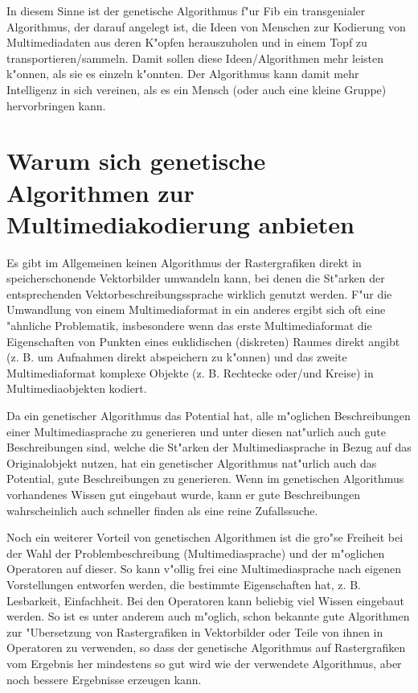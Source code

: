 In diesem Sinne ist der genetische Algorithmus f"ur Fib ein transgenialer Algorithmus, der darauf angelegt ist, die Ideen von Menschen zur Kodierung von Multimediadaten aus deren K"opfen herauszuholen und in einem Topf zu transportieren/sammeln. Damit sollen diese Ideen/Algorithmen mehr leisten k"onnen, als sie es einzeln k"onnten. Der Algorithmus kann damit mehr Intelligenz in sich vereinen, als es ein Mensch (oder auch eine kleine Gruppe) hervorbringen kann.


\section{Warum sich genetische Algorithmen zur Multimediakodierung anbieten}

Es gibt im Allgemeinen keinen Algorithmus der Rastergrafiken direkt in speicherschonende Vektorbilder umwandeln kann, bei denen die St"arken der entsprechenden Vektorbeschreibungssprache wirklich genutzt werden. F"ur die Umwandlung von einem Multimediaformat in ein anderes ergibt sich oft eine "ahnliche Problematik, insbesondere wenn das erste Multimediaformat die Eigenschaften von Punkten eines euklidischen (diskreten) Raumes direkt angibt (z. B. um Aufnahmen direkt abspeichern zu k"onnen) und das zweite Multimediaformat komplexe Objekte (z. B. Rechtecke oder/und Kreise) in Multimediaobjekten kodiert.

Da ein genetischer Algorithmus das Potential hat, alle m"oglichen Beschreibungen einer Multimediasprache zu generieren und unter diesen nat"urlich auch gute Beschreibungen sind, welche die St"arken der Multimediasprache in Bezug auf das Originalobjekt nutzen, hat ein genetischer Algorithmus nat"urlich auch das Potential, gute Beschreibungen zu generieren. Wenn im genetischen Algorithmus vorhandenes Wissen gut eingebaut wurde, kann er gute Beschreibungen wahrscheinlich auch schneller finden als eine reine Zufallssuche.

Noch ein weiterer Vorteil von genetischen Algorithmen ist die gro"se Freiheit bei der Wahl der Problembeschreibung (Multimediasprache) und der m"oglichen Operatoren auf dieser. So kann v"ollig frei eine Multimediasprache nach eigenen Vorstellungen entworfen werden, die bestimmte Eigenschaften hat, z. B. Lesbarkeit, Einfachheit. Bei den Operatoren kann beliebig viel Wissen eingebaut werden. So ist es unter anderem auch m"oglich, schon bekannte gute Algorithmen zur "Ubersetzung von Rastergrafiken in Vektorbilder oder Teile von ihnen in Operatoren zu verwenden, so dass der genetische Algorithmus auf Rastergrafiken vom Ergebnis her mindestens so gut wird wie der verwendete Algorithmus, aber noch bessere Ergebnisse erzeugen kann.

